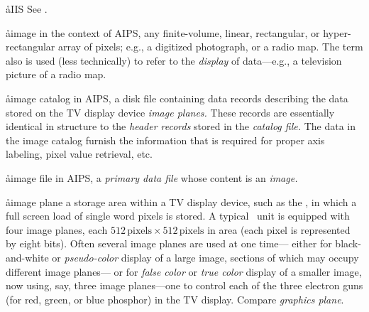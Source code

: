 \aa{IIS} See {\it \IIS}.

\aa{image}
in the context of AIPS, any finite-volume, linear, rectangular,
or hyper-rectangular array of pixels;
e.g., a digitized photograph, or a radio map.
The term also is used (less technically) to refer to the {\sl display}
of data---e.g., a television picture of a radio map.

\aa{image catalog}
in AIPS, a disk file containing data records
describing the data stored on the TV display device {\it image planes.}
These records are essentially identical in structure
to the {\it header records} stored in the {\it catalog file.}
The data in the image catalog furnish the information that
is required for proper axis labeling, pixel value retrieval, etc.

\aa{image file}
in AIPS, a {\it primary data file} whose content is an {\it image.}

\aa{image plane}
a storage area within a TV display device, such as the {\it \IIS},
in which a full screen load of single word pixels is stored.
A typical \iis\ unit is equipped with four image planes,
each $512\,\text{pixels}\times512\,\text{pixels}$ in area
(each pixel is represented by eight bits).
Often several image planes are used at one time---%
either for black-and-white or {\it pseudo-color} display
of a large image, sections of which may occupy different image planes---%
or for {\it false color} or {\it true color} display of a
smaller image, now using, say, three image planes---one to control
each of the three electron guns (for red, green, or blue phosphor)
in the TV display.
Compare {\it graphics plane}.

